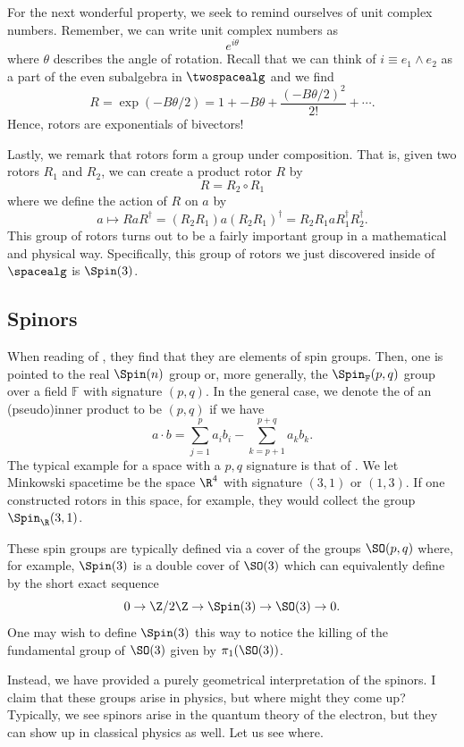 For the next wonderful property, we seek to remind ourselves of unit complex numbers.  Remember, we can write unit complex numbers as
\[
e^{i\theta}
\]
where $\theta$ describes the angle of rotation.  Recall that we can think of $i\equiv e_1 \wedge e_2$ as a part of the even subalgebra in $\twospacealg$ and we find
\[
R = \exp (-B\theta/2) = 1 + -B\theta + \frac{(-B\theta/2)^2}{2!}+\cdots.
\]
Hence, rotors are exponentials of bivectors!

Lastly, we remark that rotors form a group under composition. That is, given two rotors $R_1$ and $R_2$, we can create a product rotor $R$ by
\[
R = R_2\circ R_1
\]
where we define the action of $R$ on $a$ by
\[
a \mapsto RaR^\dagger = (R_2 R_1)a(R_2 R_1)^\dagger = R_2 R_1 a R_1^\dagger R_2^\dagger.
\]
This group of rotors turns out to be a fairly important group in a mathematical and physical way.  Specifically, this group of rotors we just discovered inside of $\spacealg$ is $\Spin(3)$.

\subsection{Spinors}

When reading of , they find that they are elements of spin groups. Then, one is pointed to the real $\Spin(n)$ group or, more generally, the $\Spin_\mathbb{F}(p,q)$ group over a field $\mathbb{F}$ with signature $(p,q)$. In the general case, we denote the  of an (pseudo)inner product to be $(p,q)$ if we have
\[
a\cdot b = \sum_{j=1}^p a_ib_i - \sum_{k=p+1}^{p+q}a_kb_k.
\]
The typical example for a space with a $p,q$ signature is that of .  We let Minkowski spacetime be the space $\R^4$ with signature $(3,1)$ or $(1,3)$.  If one constructed rotors in this space, for example, they would collect the group $\Spin_\R(3,1)$.  

These spin groups are typically defined via a cover of the groups $\SO(p,q)$ where, for example, $\Spin(3)$ is a double cover of $\SO(3)$ which can equivalently define by the short exact sequence
\[
0 \to \Z/2\Z \to \Spin(3) \to \SO(3) \to 0.
\]
One may wish to define $\Spin(3)$ this way to notice the killing of the fundamental group of $\SO(3)$ given by $\pi_1(\SO(3))$.

Instead, we have provided a purely geometrical interpretation of the spinors. I claim that these groups arise in physics, but where might they come up? Typically, we see spinors arise in the quantum theory of the electron, but they can show up in classical physics as well.  Let us see where.

